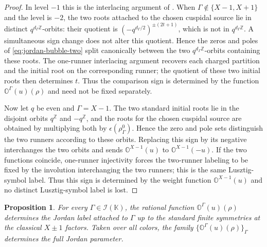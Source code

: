 \documentclass[12pt]{amsart}
\numberwithin{itemcounter}{subsection}
\theoremstyle{plain}
\newtheorem{proposition}[theorem]{Proposition}
\theoremstyle{definition}
\theoremstyle{remark}
\numberwithin{equation}{section}
\def\bbK{\mathbb{K}}
\def\bbO{\mathbb{O}}
\def\calI{\mathcal{I}}
\begin{document}
\begin{proof}
In level $-1$ this is the interlacing argument of
\cite[Corollary~4.19]{LSZ25}.  When $\Gamma\notin\{X-1,X+1\}$ and the level is $-2$, the two roots attached to the chosen cuspidal source lie in distinct $q^{d_\Gamma\mathbb Z}$-orbits: their quotient is
$(-q^{d_\Gamma/2})^{\pm(2t+1)}$, which is not in
$q^{d_\Gamma\mathbb Z}$.  A simultaneous sign change does
not alter this quotient.  Hence the zeros and poles of
\eqref{eq:jordan-bubble-two} split canonically between the two $q^{d_\Gamma\mathbb Z}$-orbits containing these roots.  The one-runner interlacing argument recovers each charged partition and the initial root on the corresponding runner; the quotient of these two initial roots then determines $t$.  Thus the comparison sign is determined by the function $\bbO^\Gamma(u)(\rho)$ and need not be fixed separately.

Now let $q$ be even and $\Gamma=X-1$.  The two standard initial roots lie in the disjoint orbits $q^{\mathbb Z}$ and $-q^{\mathbb Z}$, and the roots for the chosen cuspidal source are obtained by multiplying both by $\epsilon(\rho^0_\Gamma)$.  Hence the zero and pole sets distinguish the two runners according to these orbits.  Replacing this sign by its negative interchanges the two orbits and sends $\bbO^{X-1}(u)$ to $\bbO^{X-1}(-u)$.  If the two functions coincide, one-runner injectivity
forces the two-runner labeling to be fixed by the involution interchanging the two runners; this is the same Lusztig-symbol label.  Thus this sign is determined by the weight function $\bbO^{X-1}(u)$ and no distinct Lusztig-symbol label is lost.
\end{proof}

\begin{proposition}
\label{prop:recover-primary-jordan}
For every $\Gamma\in\calI(\bbK)$, the rational function
$\bbO^\Gamma(u)(\rho)$ determines the Jordan label attached to $\Gamma$ up to the
standard finite symmetries at the classical $X\pm1$ factors.  Taken over all
colors, the family $\{\bbO^\Gamma(u)(\rho)\}_\Gamma$ determines the full
Jordan parameter.
\end{proposition}
\end{document}
